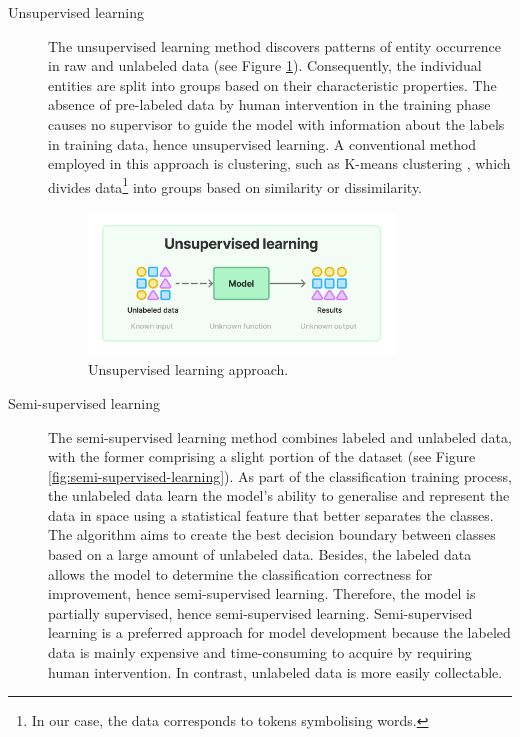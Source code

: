 \begin{description}
    \item[Unsupervised learning] The unsupervised learning method discovers patterns of entity occurrence in raw and unlabeled data (see Figure \ref{fig:unsupervised-learning}). Consequently, the individual entities are split into groups based on their characteristic properties. The absence of pre-labeled data by human intervention in the training phase causes no supervisor to guide the model with information about the labels in training data, hence unsupervised learning. A conventional method employed in this approach is clustering, such as K-means clustering \parencite{9072123kmeans}, which divides data\footnote{In our case, the data corresponds to tokens symbolising words.} into groups based on similarity or dissimilarity.
    \begin{figure}[H]
        \centering
        \includegraphics[width=0.8\textwidth]{img/theoretical/unsupervised.pdf}
        \caption{Unsupervised learning approach.}
        \label{fig:unsupervised-learning}
    \end{figure}
    \item[Semi-supervised learning] The semi-supervised learning method combines labeled and unlabeled data, with the former comprising a slight portion of the dataset (see Figure \ref{fig:semi-supervised-learning}). As part of the classification training process, the unlabeled data learn the model's ability to generalise and represent the data in space using a statistical feature that better separates the classes. The algorithm aims to create the best decision boundary between classes based on a large amount of unlabeled data. Besides, the labeled data allows the model to determine the classification correctness for improvement, hence semi-supervised learning. Therefore, the model is partially supervised, hence semi-supervised learning. Semi-supervised learning is a preferred approach for model development because the labeled data is mainly expensive and time-consuming to acquire by requiring human intervention. In contrast, unlabeled data is more easily collectable.

\end{description}
